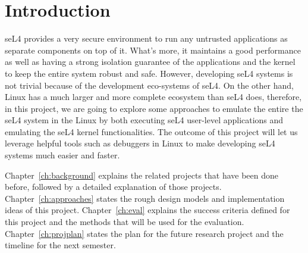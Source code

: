 \chapter{Introduction}\label{ch:intro}

seL4 provides a very secure environment to run any untrusted applications as separate components on top of it. What's more, it maintains a good performance as well as having a strong isolation guarantee of the applications and the kernel to keep the entire system robust and safe. However, developing seL4 systems is not trivial because of the development eco-systems of seL4. On the other hand, Linux has a much larger and more complete ecosystem than seL4 does, therefore, in this project, we are going to explore some approaches to emulate the entire the seL4 system in the Linux by both executing seL4 user-level applications and emulating the seL4 kernel functionalities. The outcome of this project will let us leverage helpful tools such as debuggers in Linux to make developing seL4 systems much easier and faster.

Chapter~\ref{ch:background} explains the related projects that have been done before, followed by a detailed explanation of those projects.
Chapter~\ref{ch:approaches} states the rough design models and implementation ideas of this project.
Chapter~\ref{ch:eval} explains the success criteria defined for this project and the methods that will be used for the evaluation.
Chapter~\ref{ch:projplan} states the plan for the future research project and the timeline for the next semester.